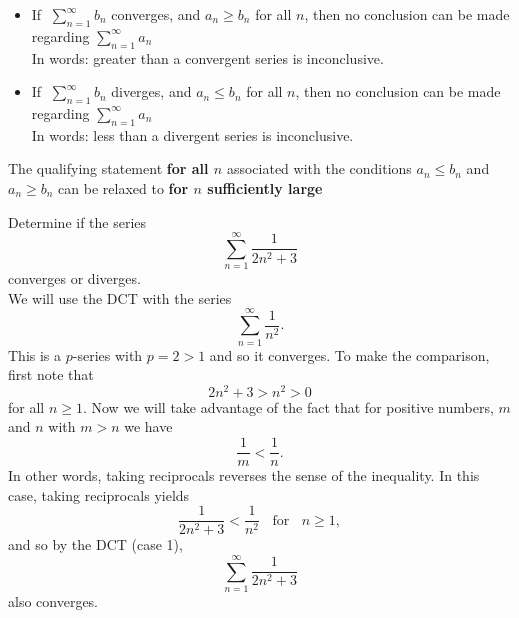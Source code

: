\documentclass[handout]{ximera}
\begin{document}
\begin{remark}
\begin{itemize}
\item
If $\; \displaystyle{\sum_{n=1}^\infty b_n}$ converges, and $a_n \geq b_n$ for all $n$,  
then no conclusion can be made regarding $\displaystyle{\sum_{n=1}^\infty a_n}$ \\
In words: greater than a convergent series is inconclusive.\\
\item
If $\; \displaystyle{\sum_{n=1}^\infty b_n}$ diverges, and $a_n \leq b_n$ for all $n$,  
then no conclusion can be made regarding $\displaystyle{\sum_{n=1}^\infty a_n}$\\
In words: less than a divergent series is inconclusive.\\
\end{itemize}
\end{remark}


\begin{remark}
The qualifying statement \textbf{for all $n$} associated with the
 conditions $a_n \leq b_n$ and $ a_n \geq b_n$ can be relaxed to
  \textbf{for $n$ sufficiently large}
\end{remark}



\begin{example}[example 1] %
Determine if the series 
\[
\sum_{n=1}^\infty \frac{1}{2n^2 + 3}
\]
converges or diverges.\\
We will use the DCT with the series 
\[
\sum_{n=1}^\infty \frac{1}{n^2}.
\] 
This is a $p$-series with $p=2 >1$ and so it converges.
To make the comparison, first note that 
\[
2n^2 + 3 > n^2 > 0
\]
 for all $n \geq 1$. Now we will take advantage of the fact that for positive numbers, $m$ and $n$ with $m>n$ we have 
 \[
 \frac{1}{m} < \frac{1}{n}.
 \]
 In other words, taking reciprocals reverses the sense of the inequality. In this case, taking reciprocals yields 
\[
\frac{1}{2n^2 + 3} < \frac{1}{n^2} \; \; \text{ for } \; \; n \geq 1,
\]
and so by the DCT (case 1), 
\[
\sum_{n=1}^\infty \frac{1}{2n^2 + 3}
\]
 also converges.
\end{example}
\end{document}

